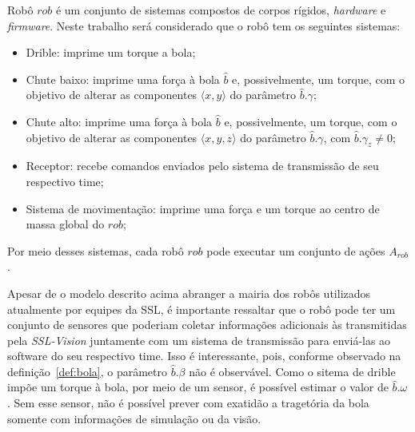 
\begin{defi}[Robô]
  Robô $rob$ é um conjunto de sistemas compostos de corpos rígidos,
  \textit{hardware} e \textit{firmware}. Neste trabalho será considerado
  que o robô tem os seguintes sistemas:

  \begin{itemize}
    \item Drible: imprime um torque a bola;
    \item Chute baixo: imprime uma força à bola $\hat{b}$
          e, possivelmente, um torque, com o objetivo de
          alterar as componentes $\langle x,y \rangle$
          do parâmetro $\hat{b}.\gamma$;
    \item Chute alto: imprime uma força à bola $\hat{b}$
          e, possivelmente, um torque, com o objetivo de
          alterar as componentes $\langle x,y,z \rangle$
          do parâmetro $\hat{b}.\gamma$, com $\hat{b}.\gamma_z \neq 0$;
    \item Receptor: recebe comandos enviados pelo sistema de
          transmissão de seu respectivo time;
    \item Sistema de movimentação: imprime uma força e um torque
          ao centro de massa global do $rob$;
  \end{itemize}
\end{defi}

  Por meio desses sistemas, cada robô $rob$ pode executar um conjunto de ações $A_{rob}$.

  Apesar de o modelo descrito acima abranger a mairia dos
  robôs utilizados atualmente por equipes da SSL, é importante
  ressaltar que o robô pode ter um conjunto de sensores que
  poderiam coletar informações adicionais às transmitidas pela
  \textit{SSL-Vision} juntamente com um sistema de transmissão
  para enviá-las ao software do seu respectivo time. Isso é
  interessante, pois, conforme observado na definição~\ref{def:bola},
  o parâmetro $\hat{b}.\beta$ não é observável. Como o sitema de
  drible impõe um torque à bola, por meio de um sensor, é possível
  estimar o valor de $\hat{b}.\omega$. Sem esse sensor, não é possível
  prever com exatidão a tragetória da bola somente com informações de
  simulação ou da visão.




